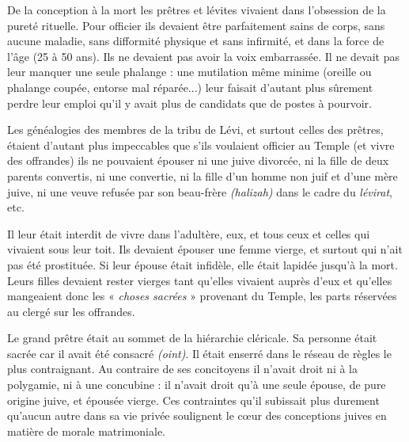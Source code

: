  De la conception à la mort les prêtres et lévites vivaient dans l'obsession de la pureté rituelle. Pour officier ils devaient être parfaitement sains de corps, sans aucune maladie, sans difformité physique et sans infirmité, et dans la force de l'âge (25 à 50 ans). Ils ne devaient pas avoir la voix embarrassée. Il ne devait pas leur manquer une seule phalange : une mutilation même minime (oreille ou phalange coupée, entorse mal réparée...) leur faisait d'autant plus sûrement perdre leur emploi qu'il y avait plus de candidats que de postes à pourvoir. 

 Les généalogies des membres de la tribu de Lévi, et surtout celles des prêtres, étaient d'autant plus impeccables que s'ils voulaient officier au Temple (et vivre des offrandes) ils ne pouvaient épouser ni une juive divorcée, ni la fille de deux parents convertis, ni une convertie, ni la fille d'un homme non juif et d'une mère juive, ni une veuve refusée par son beau-frère \emph{(halizah)} dans le cadre du \emph{lévirat}, etc. 

 Il leur était interdit de vivre dans l'adultère, eux, et tous ceux et celles qui vivaient sous leur toit. Ils devaient épouser une femme vierge, et surtout qui n'ait pas été prostituée. Si leur épouse était infidèle, elle était lapidée jusqu'à la mort. Leurs filles devaient rester vierges tant qu'elles vivaient auprès d'eux et qu'elles mangeaient donc les « \emph{choses sacrées} » provenant du Temple, les parts réservées au clergé sur les offrandes. 

 Le grand prêtre était au sommet de la hiérarchie cléricale. Sa personne était sacrée car il avait été consacré \emph{(oint)}. Il était enserré dans le réseau de règles le plus contraignant. Au contraire de ses concitoyens il n'avait droit ni à la polygamie, ni à une concubine : il n'avait droit qu'à une seule épouse, de pure origine juive, et épousée vierge. Ces contraintes qu'il subissait plus durement qu'aucun autre dans sa vie privée soulignent le cœur des conceptions juives en matière de morale matrimoniale.
 
 